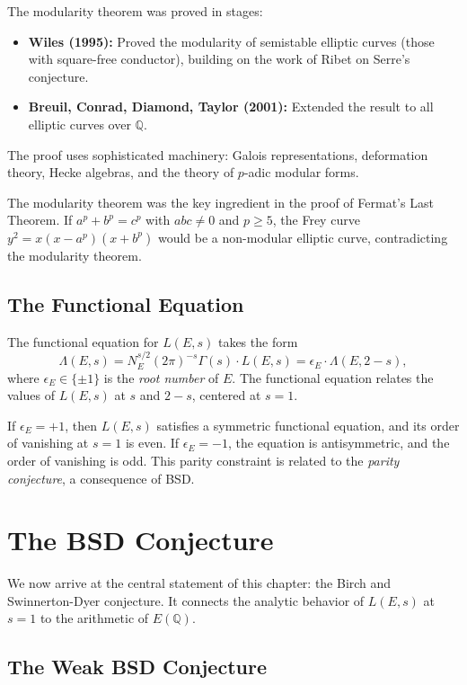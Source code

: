 The modularity theorem was proved in stages:
\begin{itemize}
\item \textbf{Wiles (1995):} Proved the modularity of semistable elliptic curves (those with square-free conductor), building on the work of Ribet on Serre's conjecture.
\item \textbf{Breuil, Conrad, Diamond, Taylor (2001):} Extended the result to all elliptic curves over $\mathbb{Q}$.
\end{itemize}

The proof uses sophisticated machinery: Galois representations, deformation theory, Hecke algebras, and the theory of $p$-adic modular forms.

\begin{remark}
The modularity theorem was the key ingredient in the proof of Fermat's Last Theorem. If $a^p + b^p = c^p$ with $abc \neq 0$ and $p \ge 5$, the Frey curve $y^2 = x(x-a^p)(x+b^p)$ would be a non-modular elliptic curve, contradicting the modularity theorem.
\end{remark}

\subsection{The Functional Equation}

The functional equation for $L(E, s)$ takes the form
\[
\Lambda(E, s) = N_E^{s/2} (2\pi)^{-s} \Gamma(s) \cdot L(E, s) = \epsilon_E \cdot \Lambda(E, 2-s),
\]
where $\epsilon_E \in \{\pm 1\}$ is the \emph{root number} of $E$. The functional equation relates the values of $L(E, s)$ at $s$ and $2-s$, centered at $s = 1$.

If $\epsilon_E = +1$, then $L(E, s)$ satisfies a symmetric functional equation, and its order of vanishing at $s = 1$ is even. If $\epsilon_E = -1$, the equation is antisymmetric, and the order of vanishing is odd. This parity constraint is related to the \emph{parity conjecture}, a consequence of BSD.

\section{The BSD Conjecture}
\label{sec:bsd-conjecture}

We now arrive at the central statement of this chapter: the Birch and Swinnerton-Dyer conjecture. It connects the analytic behavior of $L(E, s)$ at $s = 1$ to the arithmetic of $E(\mathbb{Q})$.

\subsection{The Weak BSD Conjecture}

